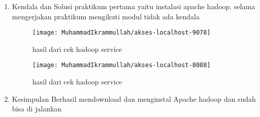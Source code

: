 
\begin{enumerate}
\item Kendala dan Solusi
\newline praktikum pertama yaitu instalasi apache hadoop. selama mengerjakan praktikum mengikuti modul tidak ada kendala

\begin{figure}[!ht]
\texttt{[image: MuhammadIkrammullah/akses-localhost-9078]}
\caption{hasil dari cek hadoop service}
\label{gam:perkuliahan15-9}
\end{figure}

\begin{figure}[!ht]
\texttt{[image: MuhammadIkrammullah/akses-localhost-8088]}
\caption{hasil dari cek hadoop service}
\label{gam:perkuliahan15-9}
\end{figure}

\item Kesimpulan
\newline Berhasil mendownload dan menginstal Apache hadoop dan sudah bisa di jalankan 
\end{enumerate}

